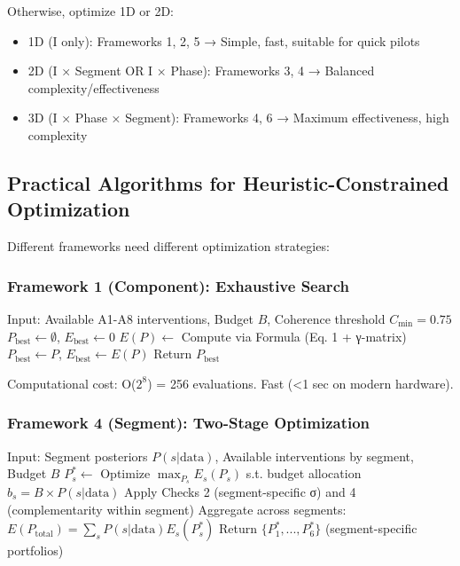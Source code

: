Otherwise, optimize 1D or 2D:
\begin{itemize}[nosep]
\item 1D (I only): Frameworks 1, 2, 5 → Simple, fast, suitable for quick pilots
\item 2D (I × Segment OR I × Phase): Frameworks 3, 4 → Balanced complexity/effectiveness
\item 3D (I × Phase × Segment): Frameworks 4, 6 → Maximum effectiveness, high complexity
\end{itemize}

\subsection{Practical Algorithms for Heuristic-Constrained Optimization}

Different frameworks need different optimization strategies:

\subsubsection{Framework 1 (Component): Exhaustive Search}

\begin{algorithm}[H]
\caption{Framework 1 Exhaustive Portfolio Search}
\begin{algorithmic}[1]
\State Input: Available A1-A8 interventions, Budget $B$, Coherence threshold $C_{\min} = 0.75$
\State $P_{\text{best}} \leftarrow \emptyset$, $E_{\text{best}} \leftarrow 0$
        \State $E(P) \leftarrow$ Compute via Formula (Eq. 1 + γ-matrix)
            \State $P_{\text{best}} \leftarrow P$, $E_{\text{best}} \leftarrow E(P)$
        \EndIf
    \EndIf
\EndFor
\State Return $P_{\text{best}}$
\end{algorithmic}
\end{algorithm}

Computational cost: O($2^8$) = 256 evaluations. Fast (<1 sec on modern hardware).

\subsubsection{Framework 4 (Segment): Two-Stage Optimization}

\begin{algorithm}[H]
\caption{Framework 4 Segment-Specific Portfolio Optimization}
\begin{algorithmic}[1]
\State Input: Segment posteriors $P(s|\text{data})$, Available interventions by segment, Budget $B$
\State {}
    \State $P_s^* \leftarrow$ Optimize $\max_{P_s} E_s(P_s)$ s.t. budget allocation $b_s = B \times P(s|\text{data})$
    \State Apply Checks 2 (segment-specific σ) and 4 (complementarity within segment)
\EndFor
\State Aggregate across segments: $E(P_{\text{total}}) = \sum_s P(s|\text{data}) E_s(P_s^*)$
\State Return $\{P_1^*, ..., P_6^*\}$ (segment-specific portfolios)
\end{algorithmic}
\end{algorithm}

